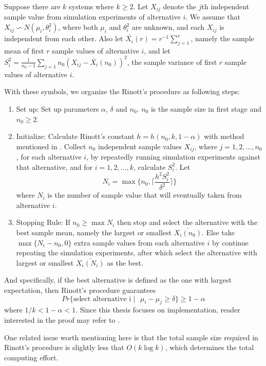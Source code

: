 \documentclass[12pt,a4]{report}
\begin{document}
Suppose there are $k$ systems where $k \geqslant 2$. Let $X_{ij}$ denote the $j$th independent sample value from simulation experiments of alternative $i$. We assume that $X_{ij} \backsim N(\mu_i, \theta_i^2)$, where both $\mu_i$ and $\theta_i^2$ are unknown, and each $X_{ij}$ is independent from each other. Also let $\bar{X_i}(r) = r^{-1}\sum_{j=1}^r$, namely the sample mean of first $r$ sample values of alternative $i$, and let $S_i^2 = \frac{1}{n_0 - 1}\sum_{j=1}{n_0}(X_{ij} - \bar{X_i}(n_0))^2$, the sample variance of first $r$ sample values of alternative $i$.

With these symbols, we organize the Rinott's procedure as following steps:

\begin{enumerate}
\item{Set up: } Set up parameters $\alpha$, $\delta$ and $n_0$. $n_0$ is the sample size in first stage and $n_0 \geqslant 2$.
\item{Initialize: } Calculate Rinott's constant $h = h(n_0, k, 1 - \alpha)$ with method mentioned in \cite{rinott-constant}. Collect $n_0$ independent sample values $X_{ij}$, where $j = 1, 2,...,n_0$, for each alternative $i$, by repeatedly running simulation experiments against that alternative, and for $i = 1, 2,...,k$, calculate $S_i^2$. Let 
$$ N_i = \max\{n_0, \lceil \frac{h^2S_i^2}{\delta^2} \rceil\} $$ where $N_i$ is the number of sample value that will eventually taken from alternative $i$.
\item{Stopping Rule: } If $n_0 \geqslant \max N_i$ then stop and select the alternative with the best sample mean, namely the largest or smallest $\bar{X_i(n_0)}$. Else take $\max\{N_i - n_0, 0\}$ extra sample values from each alternative $i$ by continue repeating the simulation experiments, after which select the alternative with largest or smallest $\bar{X_i(N_i)}$ as the best.
\end{enumerate}

And specifically, if the best alternative is defined as the one with largest expectation, then Rinott's procedure guarantees
$$ Pr\{\text{select alternative i }|\text{ }\mu_i - \mu_j \geqslant \delta \} \geqslant 1 - \alpha $$
where $1/k < 1 - \alpha < 1$. Since this thesis focuses on implementation, reader interested in the proof may refer to \cite{ras-recent-advances}. 

One related issue worth mentioning here is that the total sample size required in Rinott's procedure is slightly less that $O(k\log{k})$, which determines the total computing effort.
\end{document}
